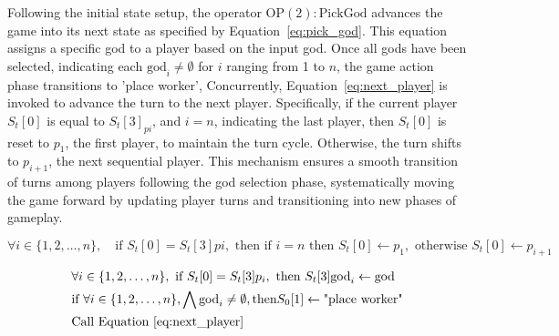 \documentclass{telkomnika}
\begin{document}
Following the initial state setup, the operator \( \text{OP}(2): \text{PickGod} \) advances the game into its next state as specified by Equation~\ref{eq:pick_god}. This equation assigns a specific god to a player based on the input god. Once all gods have been selected, indicating each \( \text{god}_i \neq \emptyset \) for \( i \) ranging from 1 to \( n \), the game action phase transitions to 'place worker', Concurrently, Equation~\ref{eq:next_player} is invoked to advance the turn to the next player. Specifically, if the current player \( S_t[0] \) is equal to \( S_t[3]_{pi} \), and \( i = n \), indicating the last player, then \( S_t[0] \) is reset to \( p_1 \), the first player, to maintain the turn cycle. Otherwise, the turn shifts to \( p_{i+1} \), the next sequential player. This mechanism ensures a smooth transition of turns among players following the god selection phase, systematically moving the game forward by updating player turns and transitioning into new phases of gameplay.

\begin{equation}
\label{eq:next_player}
\forall i \in \{1, 2, \ldots, n\}, \quad \text{if } S_t[0] = S_t[3]{pi}, \text{ then if } i=n \text{ then } S_t[0] \leftarrow p_1, \text{ otherwise } S_t[0] \leftarrow p_{i+1}
\end{equation}

\begin{equation}
    \begin{aligned}
        &\forall i \in \{1,2,\ldots, n\}, \text{ if } S_t[0] = S_t[3]p_i, \text{ then } S_t[3]\text{god}_i \leftarrow \text{god}\\
        &\text{if }\forall i \in \{1,2,\dots,n\}, \bigwedge \text{god}_i \neq \emptyset,\text{then} S_0[1] \leftarrow \text{"place worker"}\\
        &\text{Call Equation~\ref{eq:next_player}}
    \end{aligned}
    \label{eq:pick_god}
\end{equation}
\end{document}
